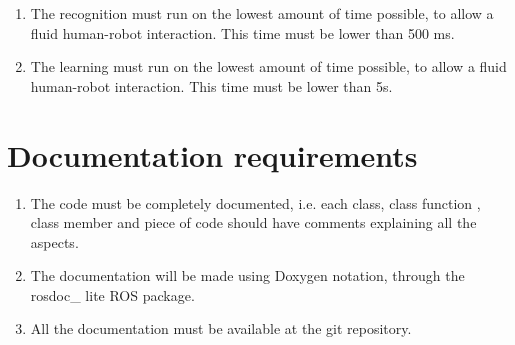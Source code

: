 \documentclass{article}
\makeatletter
\def\threedigits#1{\expandafter\@threedigits\csname c@#1\endcsname}
\def\@threedigits#1{%
  \ifnum#1<100 0\fi
  \ifnum#1<10 0\fi
  \number#1}
\makeatother
\begin{document}
\begin{enumerate}[label=\textbf{PR\threedigits*}]
\item The recognition must run on the lowest amount of time possible, to allow a fluid human-robot interaction. This time must be lower than 500 ms. 
\item The learning must run on the lowest amount of time possible, to allow a fluid human-robot interaction. This time must be lower than 5s. 
\end{enumerate}



\section{Documentation requirements}
\begin{enumerate}[label=\textbf{DR\threedigits*}]
	\item The code must be completely documented, i.e. each class, class function , class member and piece of code should have comments explaining all the aspects. 
	\item The documentation will be made using Doxygen notation, through the rosdoc\_ lite 
	ROS package. 
	\item All the documentation must be available at the git repository. 
\end{enumerate}

\end{document}

